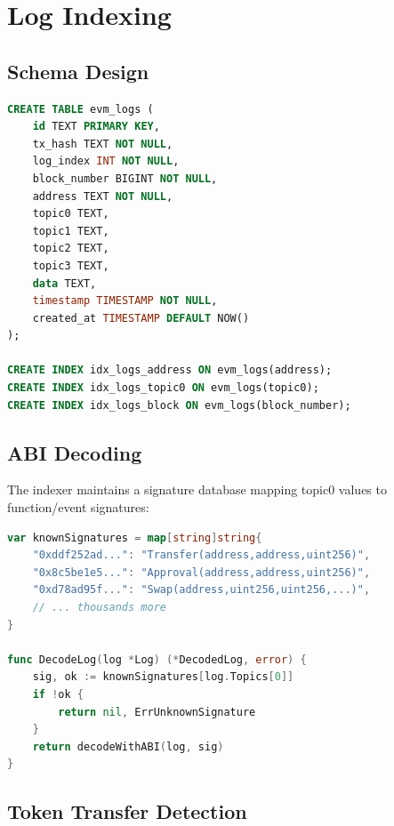 \documentclass[11pt,twocolumn]{article}
\begin{document}
\section{Log Indexing}

\subsection{Schema Design}

\begin{lstlisting}[language=SQL,caption={Event log schema}]
CREATE TABLE evm_logs (
    id TEXT PRIMARY KEY,
    tx_hash TEXT NOT NULL,
    log_index INT NOT NULL,
    block_number BIGINT NOT NULL,
    address TEXT NOT NULL,
    topic0 TEXT,
    topic1 TEXT,
    topic2 TEXT,
    topic3 TEXT,
    data TEXT,
    timestamp TIMESTAMP NOT NULL,
    created_at TIMESTAMP DEFAULT NOW()
);

CREATE INDEX idx_logs_address ON evm_logs(address);
CREATE INDEX idx_logs_topic0 ON evm_logs(topic0);
CREATE INDEX idx_logs_block ON evm_logs(block_number);
\end{lstlisting}

\subsection{ABI Decoding}

The indexer maintains a signature database mapping topic0 values to function/event signatures:

\begin{lstlisting}[language=Go,caption={ABI signature matching}]
var knownSignatures = map[string]string{
    "0xddf252ad...": "Transfer(address,address,uint256)",
    "0x8c5be1e5...": "Approval(address,address,uint256)",
    "0xd78ad95f...": "Swap(address,uint256,uint256,...)",
    // ... thousands more
}

func DecodeLog(log *Log) (*DecodedLog, error) {
    sig, ok := knownSignatures[log.Topics[0]]
    if !ok {
        return nil, ErrUnknownSignature
    }
    return decodeWithABI(log, sig)
}
\end{lstlisting}

\subsection{Token Transfer Detection}
\end{document}
